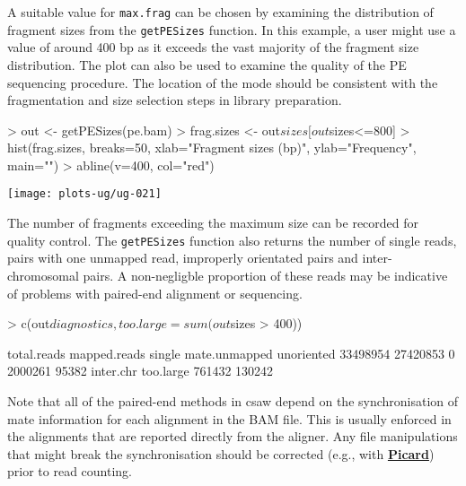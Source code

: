 \documentclass[12pt]{report}
\renewenvironment{Schunk}{\vspace{0pt}}{\vspace{0pt}}
\newcommand{\pkgname}{csaw}
\newcommand{\code}[1]{{\small\texttt{#1}}}
\begin{document}
A suitable value for \code{max.frag} can be chosen by examining the distribution of fragment sizes from the \code{getPESizes} function. 
In this example, a user might use a value of around 400 bp as it exceeds the vast majority of the fragment size distribution. 
The plot can also be used to examine the quality of the PE sequencing procedure. 
The location of the mode should be consistent with the fragmentation and size selection steps in library preparation. 

\begin{Schunk}
\begin{Sinput}
> out <- getPESizes(pe.bam)
> frag.sizes <- out$sizes[out$sizes<=800]
> hist(frag.sizes, breaks=50, xlab="Fragment sizes (bp)", ylab="Frequency", main="")
> abline(v=400, col="red")
\end{Sinput}
\end{Schunk}

\begin{center}
\texttt{[image: plots-ug/ug-021]}
\end{center}

The number of fragments exceeding the maximum size can be recorded for quality control. 
The \code{getPESizes} function also returns the number of single reads, pairs with one unmapped read, improperly orientated pairs and inter-chromosomal pairs.
A non-negligble proportion of these reads may be indicative of problems with paired-end alignment or sequencing. 

\begin{Schunk}
\begin{Sinput}
> c(out$diagnostics, too.large=sum(out$sizes > 400))
\end{Sinput}
\begin{Soutput}
  total.reads  mapped.reads        single mate.unmapped    unoriented 
     33498954      27420853             0       2000261         95382 
    inter.chr     too.large 
       761432        130242 
\end{Soutput}
\end{Schunk}

Note that all of the paired-end methods in \pkgname{} depend on the synchronisation of mate information for each alignment in the BAM file. 
This is usually enforced in the alignments that are reported directly from the aligner. 
Any file manipulations that might break the synchronisation should be corrected (e.g., with \href{http://broadinstitute.github.io/picard}{\textbf{Picard}}) prior to read counting.
\end{document}
